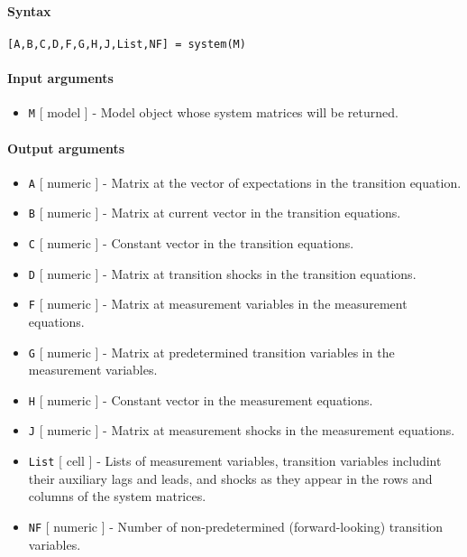 


	\paragraph{Syntax}

\begin{verbatim}
[A,B,C,D,F,G,H,J,List,NF] = system(M)
\end{verbatim}

\paragraph{Input arguments}

\begin{itemize}
\itemsep1pt\parskip0pt
\item
  \texttt{M} {[} model {]} - Model object whose system matrices will be
  returned.
\end{itemize}

\paragraph{Output arguments}

\begin{itemize}
\item
  \texttt{A} {[} numeric {]} - Matrix at the vector of expectations in
  the transition equation.
\item
  \texttt{B} {[} numeric {]} - Matrix at current vector in the
  transition equations.
\item
  \texttt{C} {[} numeric {]} - Constant vector in the transition
  equations.
\item
  \texttt{D} {[} numeric {]} - Matrix at transition shocks in the
  transition equations.
\item
  \texttt{F} {[} numeric {]} - Matrix at measurement variables in the
  measurement equations.
\item
  \texttt{G} {[} numeric {]} - Matrix at predetermined transition
  variables in the measurement variables.
\item
  \texttt{H} {[} numeric {]} - Constant vector in the measurement
  equations.
\item
  \texttt{J} {[} numeric {]} - Matrix at measurement shocks in the
  measurement equations.
\item
  \texttt{List} {[} cell {]} - Lists of measurement variables,
  transition variables includint their auxiliary lags and leads, and
  shocks as they appear in the rows and columns of the system matrices.
\item
  \texttt{NF} {[} numeric {]} - Number of non-predetermined
  (forward-looking) transition variables.
\end{itemize}

